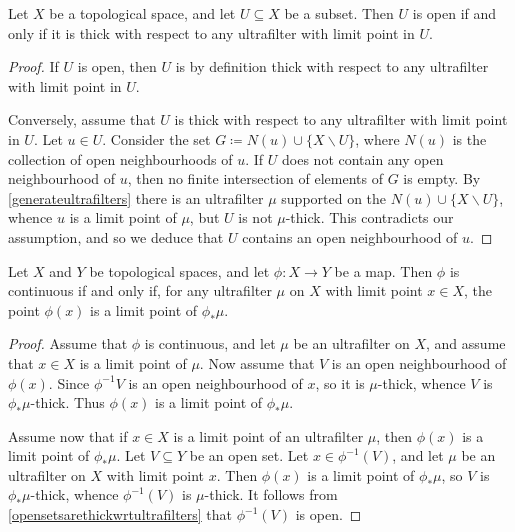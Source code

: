 \begin{lemma} \label{opensetsarethickwrtultrafilters}
	Let $ X $ be a topological space, and let $ U \subseteq X$ be a subset.
	Then $ U $ is open if and only if it is thick with respect to any ultrafilter with limit point in $ U $.
\end{lemma}

\begin{proof}
	If $ U $ is open, then $ U $ is by definition thick with respect to any ultrafilter with limit point in $ U $.

	Conversely, assume that $ U $ is thick with respect to any ultrafilter with limit point in $ U $.
	Let $ u \in U $.
	Consider the set $ G \coloneq N(u) \cup \{ X \smallsetminus U \} $, where $N(u)$ is the collection of open neighbourhoods of $u$.
	If $ U $ does not contain any open neighbourhood of $u$, then no finite intersection of elements of $ G $ is empty.
	By \ref{generateultrafilters} there is an ultrafilter $ \mu $ supported on the $ N(u) \cup \{ X \smallsetminus U \} $, whence $ u $ is a limit point of $ \mu $, but $ U $ is not $ \mu $-thick.
	This contradicts our assumption, and so we deduce that $ U $ contains an open neighbourhood of $ u $.
\end{proof}

\begin{lemma} \label{continuityviaultrafilters}
	Let $ X $ and $ Y $ be topological spaces, and let $ \phi \colon X \to Y $ be a map.
	Then $ \phi $ is continuous if and only if, for any ultrafilter $ \mu $ on $ X $ with limit point $ x \in X $, the point $ \phi(x) $ is a limit point of $ \phi_{\ast}\mu $.
\end{lemma}

\begin{proof}
	Assume that $ \phi $ is continuous, and let $ \mu $ be an ultrafilter on $ X $, and assume that $ x \in X $ is a limit point of  $ \mu $.
	Now assume that $ V $ is an open neighbourhood of $ \phi(x) $.
	Since $ \phi^{-1}V $ is an open neighbourhood of $ x $, so it is $ \mu $-thick, whence $ V $ is $\phi_{\ast}\mu$-thick.
	Thus $ \phi(x) $ is a limit point of $ \phi_{\ast}\mu $.

	Assume now that if $ x \in X $ is a limit point of an ultrafilter $ \mu $, then $ \phi(x) $ is a limit point of $ \phi_{\ast}\mu $.
	Let $ V \subseteq Y $ be an open set.
	Let $ x \in \phi^{-1}(V) $, and let $ \mu $ be an ultrafilter on $ X $ with limit point $ x $.
	Then $ \phi(x) $ is a limit point of $ \phi_{\ast}\mu $, so $V$ is $ \phi_{\ast}\mu $-thick, whence $ \phi^{-1}(V) $ is $ \mu $-thick.
	It follows from \ref{opensetsarethickwrtultrafilters} that $\phi^{-1}(V)$ is open.
\end{proof}

